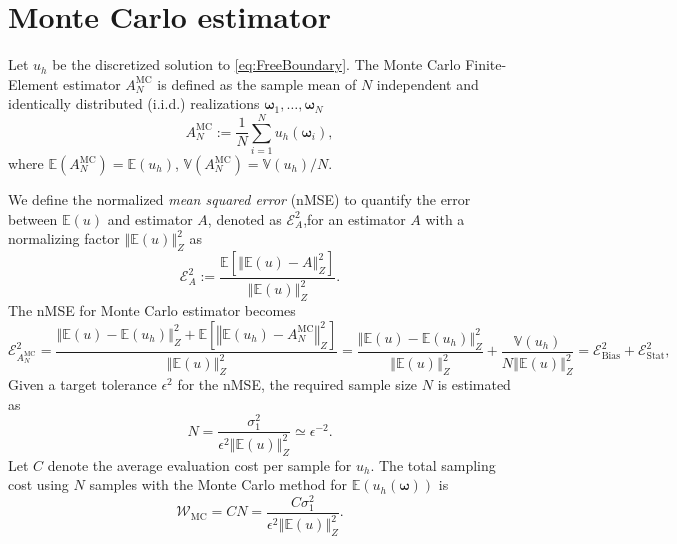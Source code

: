 \documentclass[final,3p,times,11pt]{elsarticle}
\begin{document}


\section{Monte Carlo estimator}\label{sec:MC}
Let $u_h$ be the discretized solution to \eqref{eq:FreeBoundary}. The Monte Carlo Finite-Element estimator $A^{\text{MC}}_{N}$ is defined as the sample mean of $N$ independent and identically distributed (i.i.d.) realizations $\boldsymbol{\omega}_1,\ldots,\boldsymbol{\omega}_{N}$
%
\begin{equation}\label{eq:MC_estimator}
    A^{\text{MC}}_{N} := \frac{1}{N}\sum_{i=1}^{N} u_{h}(\boldsymbol{\omega}_i),
\end{equation}
%
where $\mathbb{E}(A^{\text{MC}}_{N}) = \mathbb{E}(u_{h})$, $\mathbb{V}(A^{\text{MC}}_{N}) = \mathbb{V}( u_{h})/{N}$. 

We define the normalized \textit{mean squared error}  (nMSE) to quantify the error between $\mathbb{E}(u)$ and estimator $A$, denoted as $\mathcal{E}_{A}^2$,for an estimator $A$ with a normalizing factor $\left\Vert\mathbb{E}(u) \right\Vert_{Z}^2$  as
%
 \[
\mathcal{E}_{A}^2:=\frac{\mathbb E\left[\left\Vert\mathbb{E}(u)-A \right\Vert_{Z}^2\right]}{\left\Vert\mathbb{E}(u) \right\Vert_{Z}^2}.
\] 
%
The nMSE for Monte Carlo estimator becomes
\[
\mathcal{E}_{A^{\text{MC}}_{N}}^2 = \frac{\left\Vert\mathbb{E}(u)-\mathbb{E}(u_{h}) \right\Vert_{Z}^2+\mathbb E\left[\left\Vert \mathbb{E}(u_{h}) -A^{\text{MC}}_{N} \right\Vert_{Z}^2\right]}{\left\Vert\mathbb{E}(u) \right\Vert_{Z}^2} = \frac{\left\Vert\mathbb{E}(u)-\mathbb{E}(u_{h}) \right\Vert_{Z}^2}{\left\Vert\mathbb{E}(u) \right\Vert_{Z}^2}+\frac{\mathbb{V}\left( u_{h}\right)}{N\left\Vert\mathbb{E}(u) \right\Vert_{Z}^2}=\mathcal{E}_{\text{Bias}}^2 + \mathcal{E}_{\text{Stat}}^2,
\]
Given a target tolerance $\epsilon^2$ for the nMSE, the required sample size $N$ is estimated as 
\[
N =  \frac{\sigma_1^2}{\epsilon^2\left\Vert\mathbb{E}(u) \right\Vert_{Z}^2}\simeq \epsilon^{-2}.
\]
Let $C$ denote the average evaluation cost per sample for $u_{h}$. The total sampling cost using $N$ samples with the Monte Carlo method for $\mathbb{E}\left(u_h(\boldsymbol{\omega})\right)$ is 
\[
\mathcal{W}_\text{MC}  = CN=\frac{C\sigma_1^2}{\epsilon^2\left\Vert\mathbb{E}(u) \right\Vert_{Z}^2}.
\]
\end{document}
